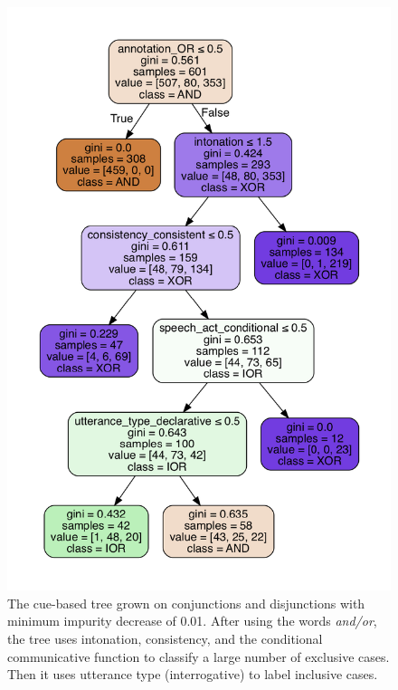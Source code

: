 \documentclass[floatsintext,man]{apa6}
\theoremstyle{definition}
\theoremstyle{definition}
\theoremstyle{definition}
\theoremstyle{remark}
\begin{document}
\begin{figure}
\centering
\includegraphics{figs/ternaryCueBased-1.pdf}
\caption{\label{fig:ternaryCueBased}The cue-based tree grown on conjunctions
and disjunctions with minimum impurity decrease of 0.01. After using the
words \textit{and/or}, the tree uses intonation, consistency, and the
conditional communicative function to classify a large number of
exclusive cases. Then it uses utterance type (interrogative) to label
inclusive cases.}
\end{figure}
\end{document}
